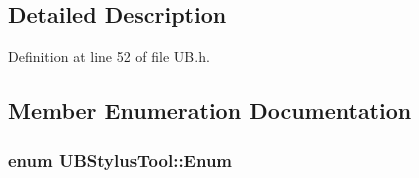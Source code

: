 \subsection{Detailed Description}


Definition at line 52 of file U\-B.\-h.



\subsection{Member Enumeration Documentation}
\hypertarget{struct_u_b_stylus_tool_acc3e432aa8846d2ec16c6c2d914ce9e9}{
\subsubsection[{Enum}]{\setlength{\rightskip}{0pt plus 5cm}enum {\bf U\-B\-Stylus\-Tool\-::\-Enum}}}\label{d4/dd7/struct_u_b_stylus_tool_acc3e432aa8846d2ec16c6c2d914ce9e9}
